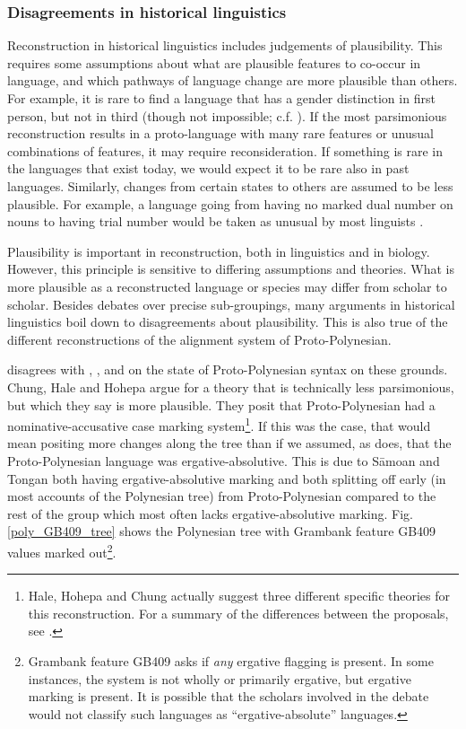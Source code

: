 \documentclass[a4paper,10pt]{article} %
\begin{document}
\subsubsection{Disagreements in historical linguistics}
Reconstruction in historical linguistics includes judgements of plausibility. This requires some assumptions about what are plausible features to co-occur in language, and which pathways of language change are more plausible than others. For example, it is rare to find a language that has a gender distinction in first person, but not in third (though not impossible; c.f. \citet{wals-44}). If the most parsimonious reconstruction results in a proto-language with many rare features or unusual combinations of features, it may require reconsideration. If something is rare in the languages that exist today, we would expect it to be rare also in past languages. Similarly, changes from certain states to others are assumed to be less plausible. For example, a language going from having no marked dual number on nouns to having trial number would be taken as unusual by most linguists \citep[c.f.][8]{kikusawa_2006_pro_number}. 

Plausibility is important in reconstruction, both in linguistics and in biology. However, this principle is sensitive to differing assumptions and theories. What is more plausible as a reconstructed language or species may differ from scholar to scholar. Besides debates over precise sub-groupings, many arguments in historical linguistics boil down to disagreements about plausibility. This is also true of the different reconstructions of the alignment system of Proto-Polynesian.

\citet{clark1976aspects} disagrees with \citet{hale_1968}, \citet{hohepa_1969}, and \citet{chung1978} on the state of Proto-Polynesian syntax on these grounds. Chung, Hale and Hohepa argue for a theory that is technically less parsimonious, but which they say is more plausible. They posit that Proto-Polynesian had a nominative-accusative case marking system\footnote{Hale, Hohepa and Chung actually suggest three different specific theories for this reconstruction. For a summary of the differences between the proposals, see \citet[247-249]{chung1978}.}. If this was the case, that would mean positing more changes along the tree than if we assumed, as \citet{clark1976aspects} does, that the Proto-Polynesian language was ergative-absolutive. This is due to S\={a}moan and Tongan both having ergative-absolutive marking and both splitting off early (in most accounts of the Polynesian tree) from Proto-Polynesian compared to the rest of the group which most often lacks ergative-absolutive marking. Fig. \ref{poly_GB409_tree} shows the Polynesian tree with Grambank feature GB409 values marked out\footnote{Grambank feature GB409 asks if \emph{any} ergative flagging is present. In some instances, the system is not wholly or primarily ergative, but ergative marking is present. It is possible that the scholars involved in the debate would not classify such languages as ``ergative-absolute'' languages.}.
\end{document}
